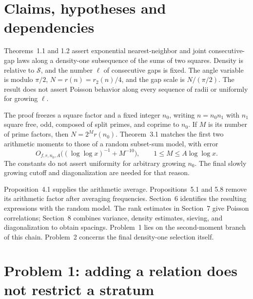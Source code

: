 \documentclass[10pt]{article}
\begin{document}
\section*{Claims, hypotheses and dependencies}
Theorems 1.1 and 1.2 assert exponential nearest-neighbor and joint consecutive-gap laws along a density-one subsequence of the sums of two squares. Density is relative to \(\mathcal S\), and the number \(\ell\) of consecutive gaps is fixed. The angle variable is modulo \(\pi/2\), \(N=r(n)=r_2(n)/4\), and the gap scale is \(N/(\pi/2)\). The result does not assert Poisson behavior along every sequence of radii or uniformly for growing \(\ell\).\par
The proof freezes a square factor and a fixed integer \(n_0\), writing \(n=n_0n_1\) with \(n_1\) square free, odd, composed of split primes, and coprime to \(n_0\). If \(M\) is its number of prime factors, then \(N=2^M r(n_0)\). Theorem 3.1 matches the first two arithmetic moments to those of a random subset-sum model, with error \[O_{f,r,n_0,A}\bigl((\log\log x)^{-1}+M^{-10}\bigr),
 \qquad 1\le M\le A\log\log x.\] The constants do not assert uniformity for arbitrary growing \(n_0\). The final slowly growing cutoff and diagonalization are needed for that reason.\par
Proposition 4.1 supplies the arithmetic average. Propositions 5.1 and 5.8 remove its arithmetic factor after averaging frequencies. Section 6 identifies the resulting expressions with the random model. The rank estimates in Section 7 give Poisson correlations; Section 8 combines variance, density estimates, sieving, and diagonalization to obtain spacings. Problem 1 lies on the second-moment branch of this chain. Problem 2 concerns the final density-one selection itself.\par
\section*{Problem 1: adding a relation does not restrict a stratum}
\end{document}
